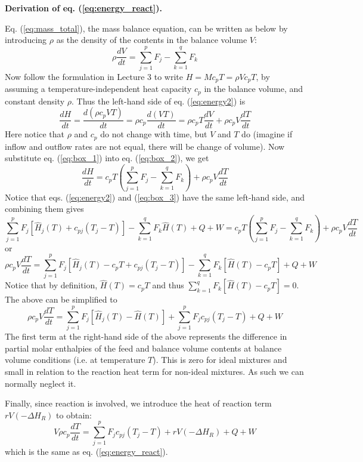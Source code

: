 \documentclass[a4paper,11pt]{article}
\theoremstyle{definition}
\begin{document}
\begin{tcolorbox}
\textbf{Derivation of eq. (\ref{eq:energy_react}).}

Eq. (\ref{eq:mass_total}), the mass balance equation, can be written as below by introducing $\rho$ as the density of
the contents in the balance volume $V$:
\begin{equation} \label{eq:box_1}
	\rho \frac{d V}{d t} = \sum_{j=1}^p F_j - \sum_{k=1}^q F_k 
\end{equation}
\noindent Now follow the formulation in Lecture 3 to write $H = M c_p T = \rho V c_p T$, by assuming a temperature-independent
heat capacity $c_p$ in the balance volume, and constant density $\rho$. Thus the left-hand side of eq. (\ref{eq:energy2})
is
\begin{equation} \label{eq:box_2}
	\frac{d H}{d t} = \frac{d (\rho c_p V T)}{d t} = \rho c_p \frac{d (V T)}{d t} = \rho c_p T \frac{d V}{d t} + \rho c_p V \frac{d T}{d t}
\end{equation}
\noindent Here notice that $\rho$ and $c_p$ do not change with time, but $V$ and $T$ do (imagine if inflow and outflow rates are not equal,
there will be change of volume).
Now substitute eq. (\ref{eq:box_1}) into eq. (\ref{eq:box_2}), we get
\begin{equation} \label{eq:box_3}
	\frac{d H}{d t} = c_p T \left( \sum_{j=1}^p F_j - \sum_{k=1}^q F_k  \right) + \rho c_p V \frac{d T}{d t}
\end{equation}
\noindent Notice that eqs. (\ref{eq:energy2}) and (\ref{eq:box_3}) have the same left-hand side, and combining them
gives
\[
	\sum_{j=1}^p F_j \left[ \hat{H}_j(T) + c_{pj} (T_j - T) \right] - \sum_{k=1}^q F_k \hat{H}(T)  + Q + W = c_p T \left( \sum_{j=1}^p F_j - \sum_{k=1}^q F_k  \right) + \rho c_p V \frac{d T}{d t}
\]
\noindent or
\begin{equation} \label{eq:box_4}
	\rho c_p V \frac{d T}{d t} = \sum_{j=1}^p F_j \left[ \hat{H}_j(T) - c_p T + c_{pj} (T_j - T) \right] - \sum_{k=1}^q F_k \left[ \hat{H}(T)  - c_p T \right] + Q + W 
\end{equation}
\noindent Notice that by definition, $\hat{H}(T) = c_p T$ and thus $\sum_{k=1}^q F_k \left[ \hat{H}(T)  - c_p T \right] = 0$. The above can be simplified to
\begin{equation} \label{eq:box_5}
	\rho c_p V \frac{d T}{d t} = \sum_{j=1}^p F_j \left[ \hat{H}_j(T) - \hat{H}(T) \right] + \sum_{j=1}^p F_j c_{pj} (T_j - T) + Q + W 
\end{equation}
The first term at the right-hand side of the above represents the difference in partial molar enthalpies of the feed
and balance volume contents at balance volume conditions (i.e. at temperature $T$). This is zero for ideal
mixtures and small in relation to the reaction heat term for non-ideal mixtures. As such we can normally neglect it.

Finally, since reaction is involved, we introduce the heat of reaction term $r V (-\Delta H_R)$ to obtain:
\begin{equation}
	V \rho c_p \frac{d T}{d t} = \sum_{j=1}^p F_j c_{pj} (T_j - T) + r V (-\Delta H_R) + Q + W
\end{equation}
\noindent which is the same as eq. (\ref{eq:energy_react}).

\end{tcolorbox}
\end{document}
